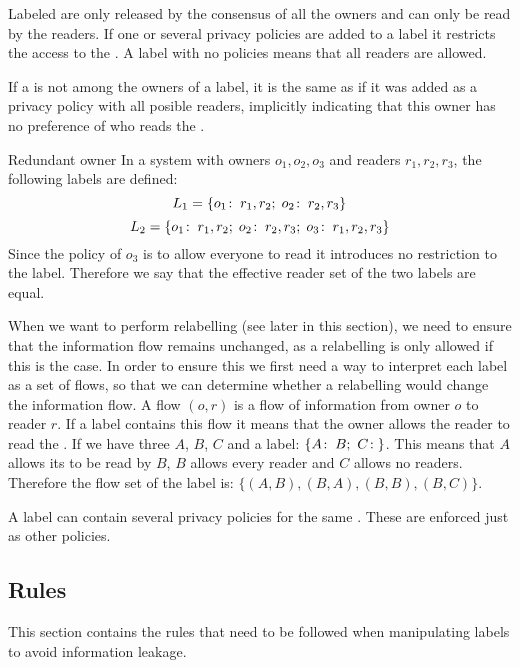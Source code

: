 Labeled \xvalues{} are only released by the consensus of all the owners and can only be read by the readers.
If one or several privacy policies are added to a label it restricts the access to the \xvalue{}.
A label with no policies  means that all readers are allowed.

If a \principal{} is not among the owners of a label, it is the same as if it was added as a privacy policy with all posible readers, implicitly indicating that this owner has no preference of who reads the \xvalue{}.

\begin{example}{Redundant owner}
In a system with owners $o_1, o_2, o_3$ and readers $r_1, r_2, r_3$, the following labels are defined:
$$L_1 = \{o_1\!:\;r_1,r_2;\; o_2\!:\;r_2, r_3\}$$
$$L_2 = \{o_1\!:\;r_1,r_2;\; o_2\!:\;r_2, r_3;\; o_3\!:\;r_1, r_2, r_3\}$$
Since the policy of $o_3$ is to allow everyone to read it introduces no restriction to the label.
Therefore we say that the effective reader set of the two labels are equal.
\end{example}

When we want to perform relabelling (see later in this section), we need to ensure that the information flow remains unchanged, as a relabelling is only allowed if this is the case.
In order to ensure this we first need a way to interpret each label as a set of flows, so that we can determine whether a relabelling would change the information flow.
A flow $(o,r)$ is a flow of information from owner $o$ to reader $r$.
If a label contains this flow it means that the owner allows the reader to read the \xvalue{}.
If we have three \principals{} $A$, $B$, $C$ and a label: $\{\policy{A}{B}; \ \policy{C}{}\}$.
This means that $A$ allows its \xvalue{} to be read by $B$, $B$ allows every reader and $C$ allows no readers.
Therefore the flow set of the label is: $\{(A,B), (B,A), (B,B), (B,C) \}$.

A label can contain several privacy policies for the same \principal{}.
These are enforced just as other policies.

\subsection{Rules}
This section contains the rules that need to be followed when manipulating labels to avoid information leakage.

